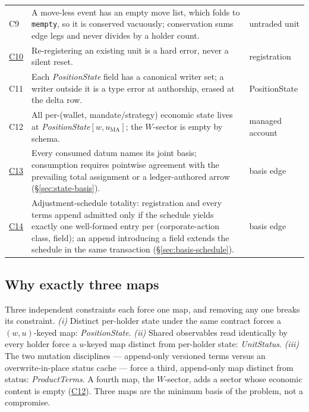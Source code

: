 \begin{longtable}{@{}p{0.8cm} p{11.0cm} p{2.5cm}@{}}
\addlinespace
\hypertarget{cond:C9}{C9}\label{cond:C9} & A move-less event has an empty move list, which
folds to \texttt{mempty}, so it is conserved vacuously; conservation sums edge legs and never
divides by a holder count. & untraded unit \\
\addlinespace
\hyperref[cond:C10]{C10} & Re-registering an existing unit is a hard
error, never a silent reset. & registration \\
\addlinespace
\hypertarget{cond:C11}{C11}\label{cond:C11} & Each \emph{PositionState} field has a
canonical writer set; a writer outside it is a type error at authorship, erased at the
delta row. & PositionState \\
\addlinespace
\hypertarget{cond:C12}{C12}\label{cond:C12} & All per-(wallet, mandate/strategy) economic
state lives at \emph{PositionState}$[w,u_{\mathrm{MA}}]$; the $W$-sector is empty by
schema. & managed account \\
\addlinespace
\hyperref[cond:C13]{C13} & Every consumed datum names its joint basis; consumption
requires pointwise agreement with the prevailing total assignment or a ledger-authored
arrow (\S\ref{sec:state-basis}). & basis edge \\
\addlinespace
\hyperref[cond:C14]{C14} & Adjustment-schedule totality: registration and every terms
append admitted only if the schedule yields exactly one well-formed entry per
(corporate-action class, field); an append introducing a field extends the schedule in
the same transaction (\S\ref{sec:basis-schedule}). & basis edge \\
\bottomrule
\end{longtable}

\subsection{Why exactly three maps}
\label{sec:states-pareto-three}

Three independent constraints each force one map, and removing any one breaks its
constraint. \emph{(i)} Distinct per-holder state under the same contract forces a
$(w,u)$-keyed map: \emph{PositionState}. \emph{(ii)} Shared observables read identically
by every holder force a $u$-keyed map distinct from per-holder state: \emph{UnitStatus}.
\emph{(iii)} The two mutation disciplines --- append-only versioned terms versus an
overwrite-in-place status cache --- force a third, append-only map distinct from status:
\emph{ProductTerms}. A fourth map, the $W$-sector, adds a sector whose economic content
is empty (\hyperref[cond:C12]{C12}). Three maps are the minimum basis of the problem, not
a compromise.

